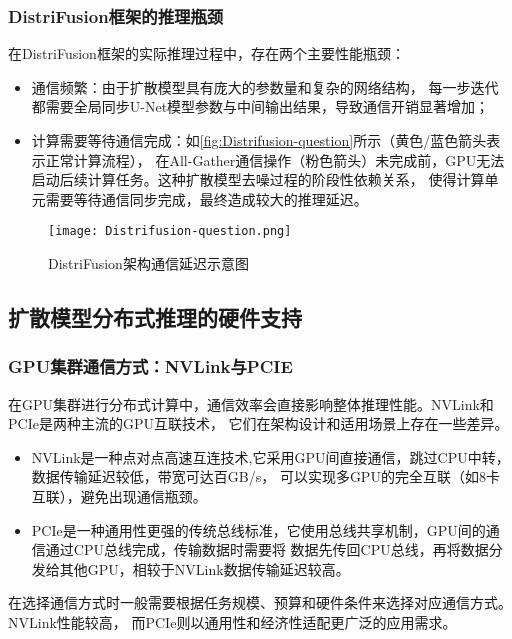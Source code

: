 \subsubsection{DistriFusion框架的推理瓶颈}
在DistriFusion框架的实际推理过程中，存在两个主要性能瓶颈：
\begin{itemize}
    \item 通信频繁：由于扩散模型具有庞大的参数量和复杂的网络结构，
    每一步迭代都需要全局同步U-Net模型参数与中间输出结果，导致通信开销显著增加；
    \item 计算需要等待通信完成：如\autoref{fig:Distrifusion-question}所示（黄色/蓝色箭头表示正常计算流程），
    在All-Gather通信操作（粉色箭头）未完成前，GPU无法启动后续计算任务。这种扩散模型去噪过程的阶段性依赖关系，
    使得计算单元需要等待通信同步完成，最终造成较大的推理延迟。
\end{itemize}
\begin{figure}[ht]
    \centering
    \texttt{[image: Distrifusion-question.png]}
    \caption{DistriFusion架构通信延迟示意图\cite{Li2024DistriFusionDP}}\label{fig:Distrifusion-question}
\end{figure}

\subsection{扩散模型分布式推理的硬件支持}
\subsubsection{GPU集群通信方式：NVLink与PCIE}
\par
在GPU集群进行分布式计算中，通信效率会直接影响整体推理性能。NVLink和PCIe是两种主流的GPU互联技术，
它们在架构设计和适用场景上存在一些差异。
\begin{itemize}
    \item NVLink是一种点对点高速互连技术,它采用GPU间直接通信，跳过CPU中转，数据传输延迟较低，带宽可达百GB/s，
    可以实现多GPU的完全互联（如8卡互联），避免出现通信瓶颈\cite{NVLink}。
    \item PCIe是一种通用性更强的传统总线标准，它使用总线共享机制，GPU间的通信通过CPU总线完成，传输数据时需要将
    数据先传回CPU总线，再将数据分发给其他GPU，相较于NVLink数据传输延迟较高\cite{PCIE}。
\end{itemize}
在选择通信方式时一般需要根据任务规模、预算和硬件条件来选择对应通信方式。NVLink性能较高，
而PCIe则以通用性和经济性适配更广泛的应用需求。
